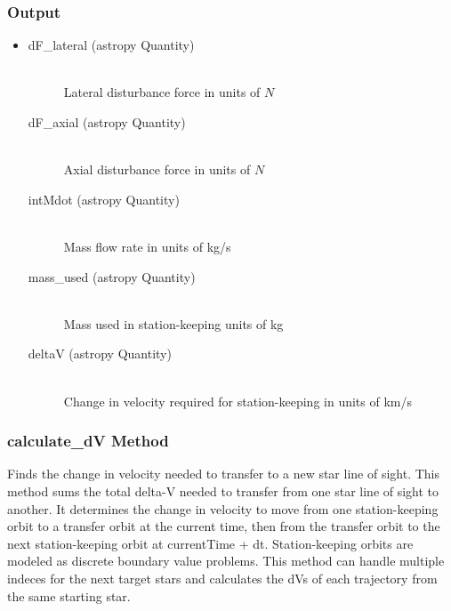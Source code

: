 \documentclass[cleanfoot]{asme2ej}
\begin{document}
\subsubsection*{Output}
\begin{itemize}
\item
\begin{description}
    \item[dF\_lateral (astropy Quantity)] \hfill \\ Lateral disturbance force in units of $N$
    \item[dF\_axial (astropy Quantity)] \hfill \\ Axial disturbance force in units of $N$
    \item[intMdot (astropy Quantity)] \hfill \\ Mass flow rate in units of kg/s
    \item[mass\_used (astropy Quantity)] \hfill \\ Mass used in station-keeping units of kg
    \item[deltaV (astropy Quantity)] \hfill \\ Change in velocity required for station-keeping in units of km/s
\end{description}
\end{itemize}

\subsubsection{calculate\_dV Method} 
Finds the change in velocity needed to transfer to a new star line of sight. This method sums the total delta-V needed to transfer from one star line of sight to another. It determines the change in velocity to move from one station-keeping orbit to a transfer orbit at the current time, then from the transfer orbit to the next station-keeping orbit at currentTime + dt. Station-keeping orbits are modeled as discrete boundary value problems. This method can handle multiple indeces for the next target stars and calculates the dVs of each trajectory from the same starting star.
\end{document}
